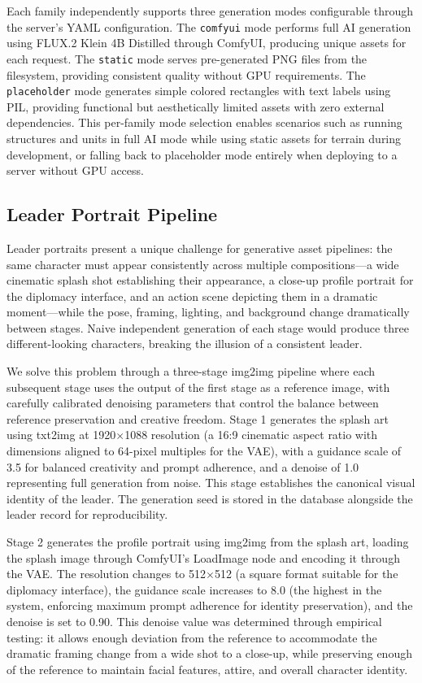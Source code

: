 \documentclass[conference]{IEEEtran}
\begin{document}
Each family independently supports three generation modes configurable through the server's YAML configuration. The \texttt{comfyui} mode performs full AI generation using FLUX.2 Klein 4B Distilled through ComfyUI, producing unique assets for each request. The \texttt{static} mode serves pre-generated PNG files from the filesystem, providing consistent quality without GPU requirements. The \texttt{placeholder} mode generates simple colored rectangles with text labels using PIL, providing functional but aesthetically limited assets with zero external dependencies. This per-family mode selection enables scenarios such as running structures and units in full AI mode while using static assets for terrain during development, or falling back to placeholder mode entirely when deploying to a server without GPU access.

\subsection{Leader Portrait Pipeline}

Leader portraits present a unique challenge for generative asset pipelines: the same character must appear consistently across multiple compositions---a wide cinematic splash shot establishing their appearance, a close-up profile portrait for the diplomacy interface, and an action scene depicting them in a dramatic moment---while the pose, framing, lighting, and background change dramatically between stages. Naive independent generation of each stage would produce three different-looking characters, breaking the illusion of a consistent leader.

We solve this problem through a three-stage img2img pipeline where each subsequent stage uses the output of the first stage as a reference image, with carefully calibrated denoising parameters that control the balance between reference preservation and creative freedom. Stage 1 generates the splash art using txt2img at 1920$\times$1088 resolution (a 16:9 cinematic aspect ratio with dimensions aligned to 64-pixel multiples for the VAE), with a guidance scale of 3.5 for balanced creativity and prompt adherence, and a denoise of 1.0 representing full generation from noise. This stage establishes the canonical visual identity of the leader. The generation seed is stored in the database alongside the leader record for reproducibility.

Stage 2 generates the profile portrait using img2img from the splash art, loading the splash image through ComfyUI's LoadImage node and encoding it through the VAE. The resolution changes to 512$\times$512 (a square format suitable for the diplomacy interface), the guidance scale increases to 8.0 (the highest in the system, enforcing maximum prompt adherence for identity preservation), and the denoise is set to 0.90. This denoise value was determined through empirical testing: it allows enough deviation from the reference to accommodate the dramatic framing change from a wide shot to a close-up, while preserving enough of the reference to maintain facial features, attire, and overall character identity.
\end{document}
